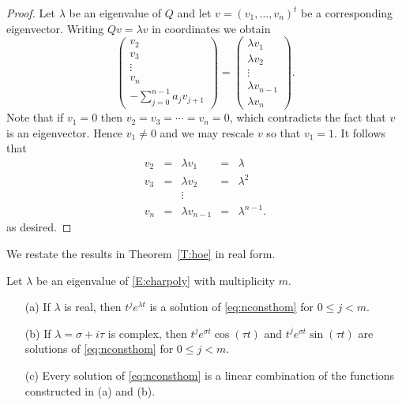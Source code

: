\documentclass{ximera}
\begin{document}
\begin{proof} Let $\lambda$ be an eigenvalue of $Q$ and let 
$v=(v_1,\ldots,v_n)^t$ be a
corresponding eigenvector.  Writing $Qv = \lambda v$
in coordinates we obtain
\[
\left(\begin{array}{c}
v_2\\
v_3\\
\vdots\\
v_n\\
-\sum_{j=0}^{n-1} a_j v_{j+1}
\end{array}\right)=
\left(\begin{array}{c}
\lambda v_1\\
\lambda v_2\\
\vdots\\
\lambda v_{n-1}\\
\lambda v_n
\end{array}\right).
\]
Note that if $v_1=0$ then $v_2=v_3=\cdots =v_n=0$, which 
contradicts the fact that $v$ is an eigenvector.  Hence $v_1\neq 0$ 
and we may rescale $v$ so that $v_1=1$.  It follows that 
\[
\begin{array}{rclrl}
v_2 & = & \lambda v_1 & = & \lambda \\
v_3 & = & \lambda v_2 & = & \lambda^2 \\
& & \vdots & & \\ 
v_n & = & \lambda v_{n-1} & = & \lambda^{n-1}.
\end{array}
\]
as desired.  \end{proof}

We restate the results in Theorem~\ref{T:hoe} in real form.
\begin{theorem}   \label{thm:HOgen}
Let $\lambda$ be an eigenvalue of \eqref{E:charpoly} with multiplicity $m$.
\begin{itemize}
\item[(a)] If $\lambda$ is real, then 
$t^je^{\lambda t}$ is a solution 
of \eqref{eq:nconsthom} for $0\leq j < m$.  
\item[(b)] If $\lambda=\sigma+i\tau$ is complex, 
then $t^je^{\sigma t}\cos(\tau t)$ and $t^je^{\sigma t}\sin(\tau t)$ are 
solutions of \eqref{eq:nconsthom} for $0\leq j < m$.
\item[(c)] Every solution of \eqref{eq:nconsthom} is a linear combination of
the functions constructed 
in (a) and (b).
\end{itemize}
\end{theorem}
\end{document}
